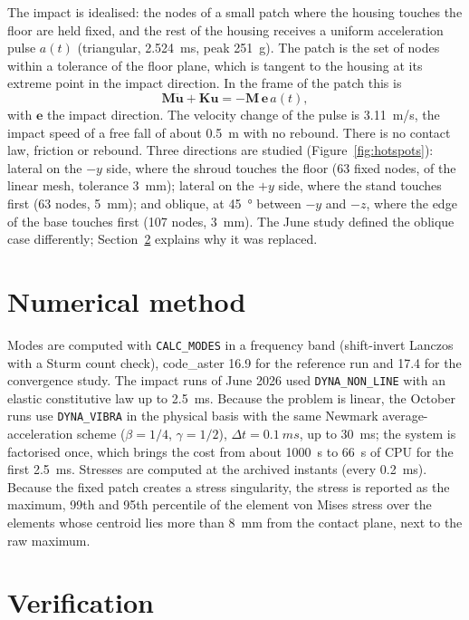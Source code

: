 \documentclass[11pt]{article}
\begin{document}
The impact is idealised: the nodes of a small patch where the housing touches the floor are held fixed, and the rest
of the housing receives a uniform acceleration pulse $a(t)$ (triangular, \SI{2.524}{ms}, peak \SI{251}{g}). The patch
is the set of nodes within a tolerance of the floor plane, which is tangent to the housing at its extreme point in the
impact direction. In the frame of the patch this is
\begin{equation}
  \mathbf{M}\ddot{\mathbf{u}}+\mathbf{K}\mathbf{u}=-\mathbf{M}\,\mathbf{e}\,a(t),
\end{equation}
with $\mathbf{e}$ the impact direction. The velocity change of the pulse is \SI{3.11}{m/s}, the impact speed of a free
fall of about \SI{0.5}{m} with no rebound. There is no contact law, friction or rebound. Three directions are
studied (Figure~\ref{fig:hotspots}): lateral on the $-y$ side, where the shroud touches the floor (63 fixed nodes,
of the linear mesh, tolerance \SI{3}{mm}); lateral on the $+y$ side, where the stand touches first (63 nodes, \SI{5}{mm}); and oblique, at
\SI{45}{\degree} between $-y$ and $-z$, where the edge of the base touches first (107 nodes, \SI{3}{mm}). The June
study defined the oblique case differently; Section~\ref{sec:verif} explains why it was replaced.

\section{Numerical method}

Modes are computed with \texttt{CALC\_MODES} in a frequency band (shift-invert Lanczos with a Sturm count check),
code\_aster 16.9 for the reference run and 17.4 for the convergence study. The impact runs of June 2026 used
\texttt{DYNA\_NON\_LINE} with an elastic constitutive law up to \SI{2.5}{ms}. Because the problem is linear, the October
runs use \texttt{DYNA\_VIBRA} in the physical basis with the same Newmark average-acceleration scheme
($\beta=1/4$, $\gamma=1/2$), $\Delta t=\SI{0.1}{ms}$, up to \SI{30}{ms}; the system is factorised once, which brings
the cost from about \SI{1000}{s} to \SI{66}{s} of CPU for the first \SI{2.5}{ms}. Stresses are computed at the
archived instants (every \SI{0.2}{ms}). Because the fixed patch creates a stress singularity, the stress is reported as
the maximum, 99th and 95th percentile of the element von Mises stress over the elements whose centroid lies more than
\SI{8}{mm} from the contact plane, next to the raw maximum.

\section{Verification}\label{sec:verif}
\end{document}
